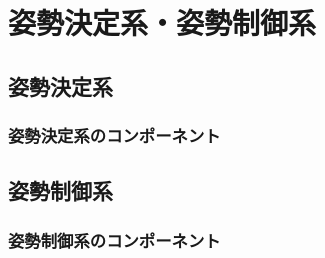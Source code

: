 \chapter{姿勢決定系・姿勢制御系}
\section{姿勢決定系}
\subsection{}
\subsection{姿勢決定系のコンポーネント}

\section{姿勢制御系}
\subsection{}
\subsection{姿勢制御系のコンポーネント}

